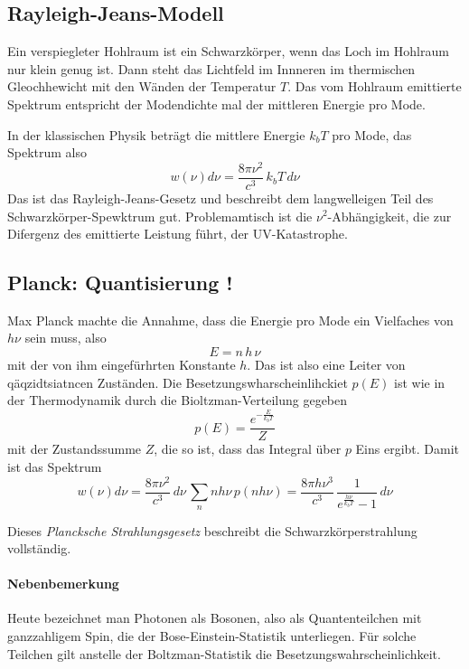 \subsection{Rayleigh-Jeans-Modell}

Ein verspiegleter Hohlraum ist ein Schwarzkörper, wenn das Loch im Hohlraum nur klein genug ist. Dann steht das Lichtfeld im Innneren im thermischen Gleochhewicht mit den Wänden der Temperatur $T$. Das vom Hohlraum emittierte Spektrum entspricht der Modendichte mal der mittleren Energie pro Mode.

In der klassischen Physik beträgt die mittlere Energie $k_b T$ pro Mode, das Spektrum also 
\begin{equation}
    w(\nu) d\nu = \frac{8 \pi \nu^2}{c^3} \, k_b T \, d\nu
\end{equation}
Das ist das Rayleigh-Jeans-Gesetz und beschreibt dem langwelleigen Teil des  Schwarzkörper-Spewktrum gut. Problemamtisch ist die $\nu^2$-Abhängigkeit, die zur Difergenz des emittierte Leistung führt, der UV-Katastrophe.


\subsection{Planck: Quantisierung !}

Max Planck machte die Annahme, dass die Energie pro Mode ein Vielfaches von $h \nu$ sein muss, also 
\begin{equation}
    E = n \, h \, \nu
\end{equation}
mit der von ihm eingefürhrten Konstante $h$. Das ist also eine Leiter von qäqzidtsiatncen Zuständen. Die Besetzungswharscheinlihckiet $p(E)$ ist wie in der Thermodynamik durch die Bioltzman-Verteilung gegeben
\begin{equation}
    p(E) = \frac{e^{- \frac{E}{k_b T}}}{Z}
\end{equation}
mit der Zustandssumme $Z$, die so ist, dass das Integral über $p$ Eins ergibt. Damit ist das Spektrum 
 \begin{equation}
     w(\nu) d\nu = \frac{8 \pi \nu^2}{c^3} \,  d\nu \, \sum_n n h \nu \, p(n h \nu)
    =  \frac{8 \pi h \nu^3}{c^3} \,  \frac{1}{e^{\frac{h \nu}{k_b T}} -1} \, d\nu 
 \end{equation}

 Dieses \emph{Plancksche Strahlungsgesetz} beschreibt die Schwarzkörperstrahlung vollständig.

 \paragraph*{Nebenbemerkung} Heute bezeichnet man Photonen als Bosonen, also als Quantenteilchen mit ganzzahligem Spin, die der Bose-Einstein-Statistik unterliegen. Für solche Teilchen gilt anstelle der Boltzman-Statistik die Besetzungswahrscheinlichkeit.

